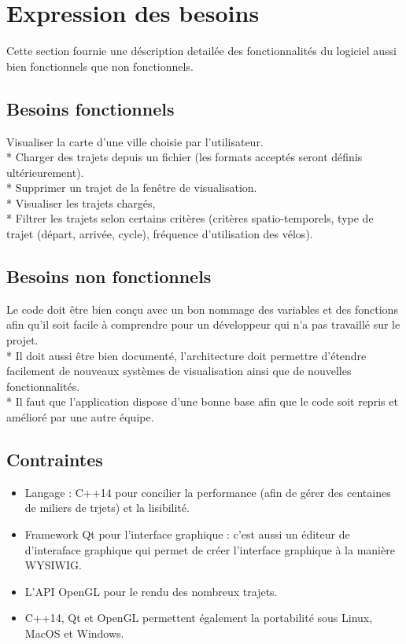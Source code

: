 \documentclass[12pt]{article}
\begin{document}
	\section{Expression des besoins}
		Cette section fournie une déscription detailée des fonctionnalités du logiciel aussi bien fonctionnels que non fonctionnels.
		\subsection{Besoins fonctionnels}
			Visualiser la carte d’une ville choisie par l'utilisateur.\\*
			Charger des trajets depuis un fichier (les formats acceptés seront définis ultérieurement).\\*
			Supprimer un trajet de la fenêtre de visualisation.\\*
			Visualiser les trajets chargés, \\*
			Filtrer les trajets selon certains critères (critères spatio-temporels, type de trajet (départ, arrivée, cycle), fréquence d'utilisation des vélos).

		\subsection{Besoins non fonctionnels}
			Le code doit être bien conçu avec un bon nommage des variables et des fonctions afin qu'il soit facile à comprendre pour un développeur qui n'a pas travaillé sur le projet.\\*
			Il doit aussi être bien documenté, l'architecture doit permettre d'étendre facilement de nouveaux systèmes de visualisation ainsi que de nouvelles fonctionnalités.\\*
			Il faut que l'application dispose d'une bonne base afin que le code soit repris et amélioré par une autre équipe.

		\subsection{Contraintes}
			\begin{itemize}
				\item Langage : C++14 pour concilier la performance (afin de gérer des centaines de miliers de trjets) et la lisibilité.
				\item Framework Qt pour l'interface graphique : c'est aussi un éditeur de d'interaface graphique qui permet de créer l'interface graphique à la manière WYSIWIG.
				\item L'API OpenGL pour le rendu des nombreux trajets.
				\item C++14, Qt et OpenGL permettent également la portabilité sous Linux, MacOS et Windows.
			\end{itemize}
\end{document}
